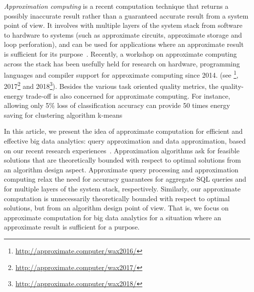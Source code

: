 \item[(3)] {\em Approximation computing} is a recent computation technique that returns a possibly inaccurate result rather than a guaranteed accurate result from a system point of view.  It involves with multiple layers of the system stack from software to hardware to systems (such as approximate circuits, approximate storage and loop perforation), and can be used for applications where an approximate result is sufficient for its purpose~\cite{AgrawalCGGNOPSS16,Mittal16b}. Recently, a workshop on approximate computing across the stack has been usefully held for research on hardware, programming languages and compiler support  for approximate computing  since 2014.  (see \footnote{\small \url{http://approximate.computer/wax2016/}}, 2017\footnote{\small  \url{http://approximate.computer/wax2017/}} and 2018\footnote{\small \url{http://approximate.computer/wax2018/}}). Besides the various task oriented quality metrics,  the quality-energy trade-off is also  concerned for approximate computing. For instance, allowing only 5\% loss of classification accuracy can provide 50 times energy saving for clustering algorithm k-means~\cite{Mittal16b}
\ei

In this article, we present the idea of approximate computation for efficient and effective big data analytics: query approximation and data approximation, based on our recent research experiences~\cite{MaCHW12,ShuaiMaVLDB12,tods-MaCFHW14,LinMZWH17,MaHWLH17,MaFLWCH16,MaFLWCH17,HuAMH16,DuanAMHH16,DuanMAMH17,rankicde2018}.
Approximation algorithms ask for feasible solutions that are theoretically bounded with respect to optimal solutions from an algorithm design aspect.
Approximate query processing and approximation computing relax the need for accuracy guarantees for aggregate SQL queries and for multiple layers of the system stack, respectively. Similarly, our approximate computation is unnecessarily theoretically bounded with respect to optimal solutions, but from an algorithm design point of view. That is, we focus on approximate computation for big data analytics for a situation where an approximate result is sufficient for a purpose.





